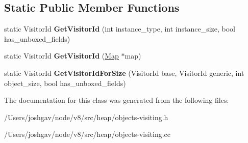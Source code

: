 \subsection*{Static Public Member Functions}
\begin{DoxyCompactItemize}
\item 
static Visitor\+Id {\bfseries Get\+Visitor\+Id} (int instance\+\_\+type, int instance\+\_\+size, bool has\+\_\+unboxed\+\_\+fields)\hypertarget{classv8_1_1internal_1_1_static_visitor_base_a3384ca116f7c3ca22d8e26f1e20c97dc}{}\label{classv8_1_1internal_1_1_static_visitor_base_a3384ca116f7c3ca22d8e26f1e20c97dc}

\item 
static Visitor\+Id {\bfseries Get\+Visitor\+Id} (\hyperlink{classv8_1_1internal_1_1_map}{Map} $\ast$map)\hypertarget{classv8_1_1internal_1_1_static_visitor_base_a0da35bcd44133a31c419a0de50dae345}{}\label{classv8_1_1internal_1_1_static_visitor_base_a0da35bcd44133a31c419a0de50dae345}

\item 
static Visitor\+Id {\bfseries Get\+Visitor\+Id\+For\+Size} (Visitor\+Id base, Visitor\+Id generic, int object\+\_\+size, bool has\+\_\+unboxed\+\_\+fields)\hypertarget{classv8_1_1internal_1_1_static_visitor_base_a3362627d5ac104ac0ce6f8a7e408504f}{}\label{classv8_1_1internal_1_1_static_visitor_base_a3362627d5ac104ac0ce6f8a7e408504f}

\end{DoxyCompactItemize}


The documentation for this class was generated from the following files\+:\begin{DoxyCompactItemize}
\item 
/\+Users/joshgav/node/v8/src/heap/objects-\/visiting.\+h\item 
/\+Users/joshgav/node/v8/src/heap/objects-\/visiting.\+cc\end{DoxyCompactItemize}
